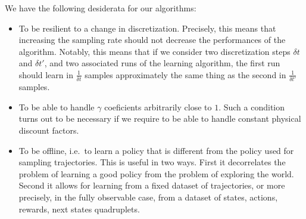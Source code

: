 \documentclass[11pt]{article}
\newcommand{\deltat}{{\delta t}}
\begin{document}
We have the following desiderata for our algorithms:
\begin{itemize}
	\item To be resilient to a change in discretization. Precisely, this
		means that increasing the sampling rate should not decrease the
		performances of the algorithm. Notably, this means that if we consider
		two discretization steps $\deltat$ and $\deltat'$, and two associated
		runs of the learning algorithm, the first run should learn in $\frac{1}{\deltat}$
		samples approximately the same thing as the second in $\frac{1}{\deltat'}$ samples.
	\item To be able to handle $\gamma$ coeficients arbitrarily close to $1$.
		Such a condition turns out to be necessary if we require to
		be able to handle constant physical discount factors.
	\item To be offline, i.e.\ to learn a policy that is different from
		the policy used for sampling trajectories. This is useful in
		two ways. First it decorrelates the problem of learning a good
		policy from the problem of exploring the world. Second it
		allows for learning from a fixed dataset of trajectories, or more
		precisely, in the fully observable case, from a dataset of
		states, actions, rewards, next states quadruplets.
\end{itemize}
\end{document}
